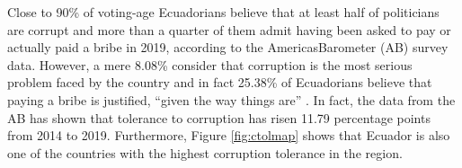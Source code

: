 \documentclass[12pt,a4]{article}\usepackage[]{graphicx}\usepackage[]{xcolor}
\begin{document}


Close to 90\% of voting-age Ecuadorians believe that at least half of politicians are corrupt and more than a quarter of them admit having been asked to pay or actually paid a bribe in 2019, according to the AmericasBarometer (AB) survey data. However, a mere 8.08\% consider that corruption is the most serious problem faced by the country and in fact 25.38\% of Ecuadorians believe that paying a bribe is justified, \enquote{given the way things are} \parencite[p. 96]{Moscoso.2018}. In fact, the data from the AB has shown that tolerance to corruption has risen 11.79 percentage points from 2014 to 2019. Furthermore, Figure \ref{fig:ctolmap} shows that Ecuador is also one of the countries with the highest corruption tolerance in the region.


\end{document}
